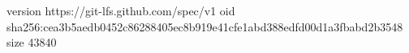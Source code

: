 version https://git-lfs.github.com/spec/v1
oid sha256:cea3b5aedb0452c86288405ec8b919e41cfe1abd388edfd00d1a3fbabd2b3548
size 43840
